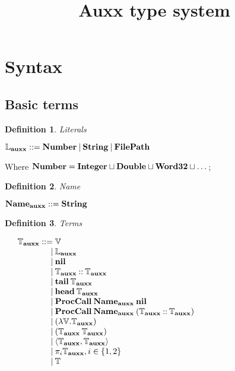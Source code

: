 \documentclass[a4paper]{article}
\date{}
\title{Auxx type system}
\newtheorem{defin}{Definition}
\begin{document}
\maketitle

\tableofcontents

\newpage

\section{Syntax}

\subsection{Basic terms}

\begin{defin} Literals

  $\mathbb{L}_{\bf auxx} ::= {\bf Number} \: | \: {\bf String} \: | \: {\bf FilePath}$
\end{defin}

Where ${\bf Number} = {\bf Integer} \sqcup {\bf Double} \sqcup  {\bf Word32} \sqcup \dots$;

\begin{defin} Name

  ${\bf Name}_{\bf auxx} ::= {\bf String}$

\end{defin}

\begin{defin} Terms

$\begin{array}{lll}
&\mathbb{T}_{\bf auxx} ::= \mathbb{V}& \\
&\quad\quad\quad\quad | \: \mathbb{L}_{\bf auxx}& \\
&\quad\quad\quad\quad | \: {\bf nil}& \\
&\quad\quad\quad\quad | \: \mathbb{T}_{\bf auxx} {\: \bf :: \:} \mathbb{T}_{\bf auxx}& \\
&\quad\quad\quad\quad | \: {\bf tail \:} \mathbb{T}_{\bf auxx}& \\
&\quad\quad\quad\quad | \: {\bf head \:} \mathbb{T}_{\bf auxx}& \\
&\quad\quad\quad\quad | \: {\bf ProcCall} \: {\bf Name}_{\bf auxx} \: {\bf nil} &\\
&\quad\quad\quad\quad | \: {\bf ProcCall} \: {\bf Name}_{\bf auxx} \: (\mathbb{T}_{\bf auxx} {\: \bf :: \:} \mathbb{T}_{\bf auxx}) &\\
&\quad\quad\quad\quad | \: (\lambda \mathbb{V}. \mathbb{T}_{\bf auxx}) & \\
&\quad\quad\quad\quad | \: (\mathbb{T}_{\bf auxx} \: \mathbb{T}_{\bf auxx})& \\
&\quad\quad\quad\quad | \: \langle \mathbb{T}_{\bf auxx}, \mathbb{T}_{\bf auxx} \rangle&\\
&\quad\quad\quad\quad | \: \pi_i \mathbb{T}_{\bf auxx}, i \in \{ 1,2 \}& \\
&\quad\quad\quad\quad | \: \mathbb{T} &
\end{array}$
\end{defin}
\end{document}
